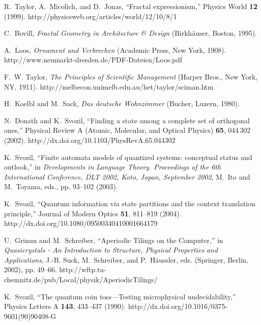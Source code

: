 \documentclass[rmp,amssymb,showpacs,showkeys,12pt,preprint]{revtex4}
\begin{document}
\begin{thebibliography}{10}
R.~Taylor, A.~Micolich, and D.~Jonas, \enquote{Fractal expressionism,} Physics
  World {\bf 12} (1999).
\newline http://physicsweb.org/articles/world/12/10/8/1

C.~Bovill, {\em Fractal Geometry in Architecture \& Design\/}
  (Birkh{\"{a}}user, Boston, 1995).

A.~Loos, {\em Ornament und Verbrechen\/} (Academic Press, New York, 1908).
\newline http://www.neumarkt-dresden.de/PDF-Dateien/Loos.pdf

F.~W. Taylor, {\em The Principles of Scientific Management\/} (Harper Bros.,
  New York, NY, 1911).
\newline http://melbecon.unimelb.edu.au/het/taylor/sciman.htm

H.~Koelbl and M.~Sack, {\em Das deutsche {W}ohnzimmer\/} (Bucher, Luzern,
  1980).

N.~Donath and K.~Svozil, \enquote{Finding a state among a complete set of
  orthogonal ones,} Physical Review A (Atomic, Molecular, and Optical Physics)
  {\bf 65}, 044\,302 (2002).
\newline http://dx.doi.org/10.1103/PhysRevA.65.044302

K.~Svozil, \enquote{Finite automata models of quantized systems: conceptual
  status and outlook,} in {\em Developments in Language Theory. Proceedings of
  the 6th International Conference, {DLT 2002}, {K}oto, {J}apan, {S}eptember
  2002\/}, M.~Ito and M.~Toyama, eds.,  pp. 93--102 (2003).

K.~Svozil, \enquote{Quantum information via state partitions and the context
  translation principle,} Journal of Modern Optics {\bf 51}, 811--819 (2004).
\newline http://dx.doi.org/10.1080/09500340410001664179

U.~Grimm and M.~Schreiber, \enquote{Aperiodic Tilings on the Computer,} in {\em
  Quasicrystals - An Introduction to Structure, Physical Properties and
  Applications\/}, J.-B. Suck, M.~Schreiber, and P.~H{\"{a}}ussler, eds.
  (Springer, Berlin, 2002), pp. 49--66.
\newline http://wftp.tu-chemnitz.de/pub/Local/physik/AperiodicTilings/

K.~Svozil, \enquote{The quantum coin toss---Testing microphysical
  undecidability,} Physics Letters A {\bf 143}, 433--437 (1990).
\newline http://dx.doi.org/10.1016/0375-9601(90)90408-G


\end{thebibliography}
\end{document}
